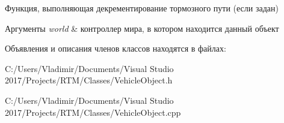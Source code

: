 Функция, выполняющая декрементирование тормозного пути (если задан) 


\begin{DoxyParams}{Аргументы}
{\em world} & контроллер мира, в котором находится данный объект \\
\hline
\end{DoxyParams}


Объявления и описания членов классов находятся в файлах\+:\begin{DoxyCompactItemize}
\item 
C\+:/\+Users/\+Vladimir/\+Documents/\+Visual Studio 2017/\+Projects/\+R\+T\+M/\+Classes/Vehicle\+Object.\+h\item 
C\+:/\+Users/\+Vladimir/\+Documents/\+Visual Studio 2017/\+Projects/\+R\+T\+M/\+Classes/Vehicle\+Object.\+cpp\end{DoxyCompactItemize}
